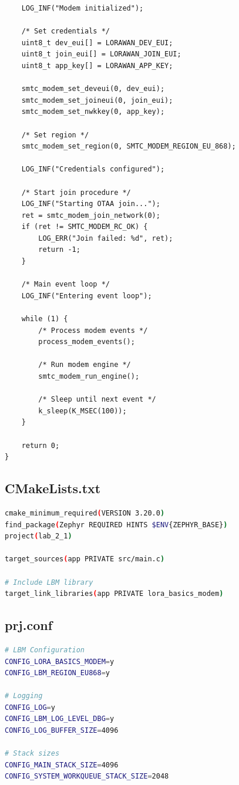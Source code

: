 \documentclass[11pt,a4paper]{article}
\begin{document}
\begin{solutionbox}
\begin{lstlisting}
    LOG_INF("Modem initialized");

    /* Set credentials */
    uint8_t dev_eui[] = LORAWAN_DEV_EUI;
    uint8_t join_eui[] = LORAWAN_JOIN_EUI;
    uint8_t app_key[] = LORAWAN_APP_KEY;

    smtc_modem_set_deveui(0, dev_eui);
    smtc_modem_set_joineui(0, join_eui);
    smtc_modem_set_nwkkey(0, app_key);

    /* Set region */
    smtc_modem_set_region(0, SMTC_MODEM_REGION_EU_868);

    LOG_INF("Credentials configured");

    /* Start join procedure */
    LOG_INF("Starting OTAA join...");
    ret = smtc_modem_join_network(0);
    if (ret != SMTC_MODEM_RC_OK) {
        LOG_ERR("Join failed: %d", ret);
        return -1;
    }

    /* Main event loop */
    LOG_INF("Entering event loop");

    while (1) {
        /* Process modem events */
        process_modem_events();

        /* Run modem engine */
        smtc_modem_run_engine();

        /* Sleep until next event */
        k_sleep(K_MSEC(100));
    }

    return 0;
}
\end{lstlisting}

\subsection{CMakeLists.txt}

\begin{lstlisting}[language=bash]
cmake_minimum_required(VERSION 3.20.0)
find_package(Zephyr REQUIRED HINTS $ENV{ZEPHYR_BASE})
project(lab_2_1)

target_sources(app PRIVATE src/main.c)

# Include LBM library
target_link_libraries(app PRIVATE lora_basics_modem)
\end{lstlisting}

\subsection{prj.conf}

\begin{lstlisting}[language=bash]
# LBM Configuration
CONFIG_LORA_BASICS_MODEM=y
CONFIG_LBM_REGION_EU868=y

# Logging
CONFIG_LOG=y
CONFIG_LBM_LOG_LEVEL_DBG=y
CONFIG_LOG_BUFFER_SIZE=4096

# Stack sizes
CONFIG_MAIN_STACK_SIZE=4096
CONFIG_SYSTEM_WORKQUEUE_STACK_SIZE=2048
\end{lstlisting}

\end{solutionbox}
\end{document}
